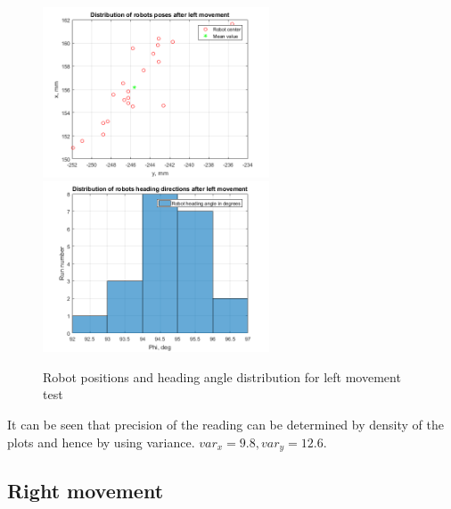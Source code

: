 \documentclass[a4paper, 12pt]{article}
\begin{document}
\begin{figure}[h]
  \centering
  \caption{Robot positions and heading angle distribution for left movement test\label{fig:LL}}
  \includegraphics[width=0.6\textwidth]{LL}
  \includegraphics[width=0.6\textwidth]{LLphi}
\end{figure}

It can be seen that precision of the reading can be determined by density of the plots and hence by using variance. $var_x = 9.8,var_y = 12.6$.
\newpage
\subsection{Right movement}
\end{document}
